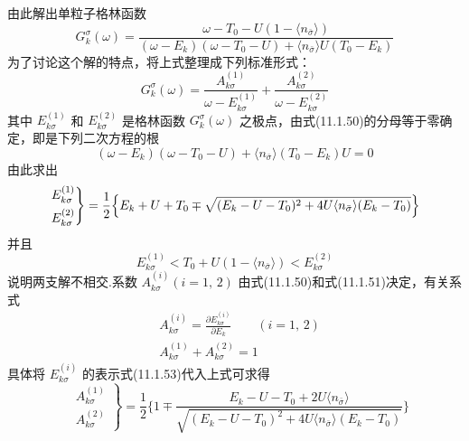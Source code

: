 由此解出单粒子格林函数
\begin{equation}
  G^{\sigma}_{k}(\omega)=
  \frac{\omega-T_{0}-U(1-\langle n_{\bar{\sigma}}\rangle)}
  {(\omega-E_{k})(\omega-T_{0}-U)+\langle n_{\bar{\sigma}}\rangle U(T_{0}-E_{k})}
\end{equation}
为了讨论这个解的特点，将上式整理成下列标准形式：
\begin{equation}
  G^{\sigma}_{k}(\omega)=\frac{A^{(1)}_{k\sigma}}{\omega-E^{(1)}_{k\sigma}}
  +\frac{A^{(2)}_{k\sigma}}{\omega-E^{(2)}_{k\sigma}}
\end{equation}
其中 $E^{(1)}_{k\sigma}$ 和 $E^{(2)}_{k\sigma}$ 是格林函数 $G^{\sigma}_{k}(\omega)$ 之极点，由式(11.1.50)的分母等于零确定，即是下列二次方程的根
\begin{equation}
  (\omega-E_{k})(\omega-T_{0}-U)
  +\langle n_{\bar{\sigma}}\rangle(T_{0}-E_{k})U=0
\end{equation}
由此求出
\begin{equation}
\left.
\begin{aligned}
  &E^{(1)}_{k\sigma}\\
  &E^{(2)}_{k\sigma}
\end{aligned}\right\}
  =\frac{1}{2}\Bigl\{E_{k}+U+T_{0}
  \mp\sqrt{(E_{k}-U-T_{0})^{2}+4U\langle n_{\bar{\sigma}}\rangle(E_{k}-T_{0})}\Bigr\}
\end{equation}
并且
\begin{equation}
  E^{(1)}_{k\sigma}<T_{0}+U(1-\langle n_{\bar{\sigma}}\rangle)
  <E^{(2)}_{k\sigma}
\end{equation}
说明两支解不相交.系数 $A^{(i)}_{k\sigma}(i=1,\,2)$ 由式(11.1.50)和式(11.1.51)决定，有关系式
\begin{equation}
\begin{aligned}
  &A^{(i)}_{k\sigma}=\frac{\partial E^{(i)}_{k\sigma}}{\partial E_{k}}
  \qquad(i=1,\,2)\\
  &A^{(1)}_{k\sigma}+A^{(2)}_{k\sigma}=1
\end{aligned}
\end{equation}
具体将 $E^{(i)}_{k\sigma}$ 的表示式(11.1.53)代入上式可求得
\begin{equation}
\left.
\begin{aligned}
  &A^{(1)}_{k\sigma}\\
  &A^{(2)}_{k\sigma}
\end{aligned}\right\}
  =\frac{1}{2}\Biggl\{1\mp
  \frac{E_{k}-U-T_{0}+2U\langle n_{\bar{\sigma}}\rangle}
  {\sqrt{(E_{k}-U-T_{0})^{2}+4U\langle n_{\bar{\sigma}}\rangle(E_{k}-T_{0})}}\Biggr\}
\end{equation}
